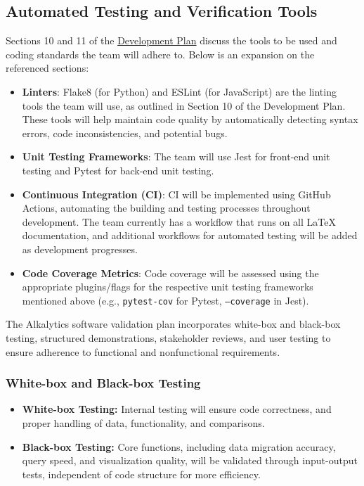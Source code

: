 \documentclass[12pt, titlepage]{article}
\begin{document}
\subsection{Automated Testing and Verification Tools} \label{testingTools}
Sections 10 and 11 of the
\href{https://github.com/SumanyaG/Alkalytics/blob/main/docs/DevelopmentPlan/DevelopmentPlan.pdf}{Development
Plan} discuss the tools to be used and coding standards the team will adhere to.
Below is an expansion on the referenced sections:
\begin{itemize}
  \item \textbf{Linters}: Flake8 (for Python) and ESLint (for JavaScript) are
  the linting tools the team will use, as outlined in Section 10 of the
  Development Plan. These tools will help maintain code quality by automatically
  detecting syntax errors, code inconsistencies, and potential bugs.
  \item \textbf{Unit Testing Frameworks}: The team will use Jest for front-end
  unit testing and Pytest for back-end unit testing.
  \item \textbf{Continuous Integration (CI)}: CI will be implemented using
  GitHub Actions, automating the building and testing processes throughout
  development. The team currently has a workflow that runs on all \LaTeX{}
  documentation, and additional workflows for automated testing will be added as
  development progresses. 
  \item \textbf{Code Coverage Metrics}: Code coverage will be assessed using
  the appropriate plugins/flags for the respective unit testing frameworks
  mentioned above (e.g., \texttt{pytest-cov} for Pytest, \texttt{--coverage} in Jest).
\end{itemize}

The Alkalytics software validation plan incorporates white-box and black-box
testing, structured demonstrations, stakeholder reviews, and user testing to
ensure adherence to functional and nonfunctional requirements.

\subsubsection{White-box and Black-box Testing}
\begin{itemize}
    \item \textbf{White-box Testing:} Internal testing will ensure code
    correctness, and proper handling of data, functionality, and comparisons.
    \item \textbf{Black-box Testing:} Core functions, including data migration
    accuracy, query speed, and visualization quality, will be validated through
    input-output tests, independent of code structure for more efficiency.
\end{itemize}
\end{document}
